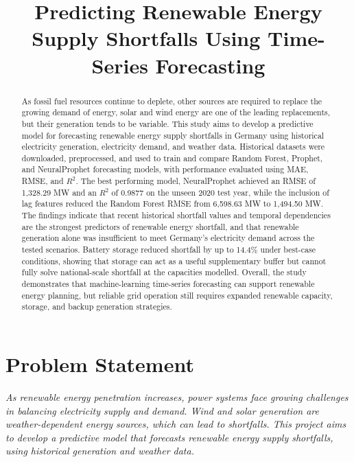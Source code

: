 \documentclass[conference]{IEEEtran}
\begin{document}
\title{Predicting Renewable Energy Supply Shortfalls Using Time-Series Forecasting}

\author{
}

\maketitle
\begin{abstract}
As fossil fuel resources continue to deplete, other sources are required to replace the growing demand of energy, solar and wind energy are one of the leading replacements, but their generation tends to be variable. This study aims to develop a predictive model for forecasting renewable energy supply shortfalls in Germany using historical electricity generation, electricity demand, and weather data. Historical datasets were downloaded, preprocessed, and used to train and compare Random Forest, Prophet, and NeuralProphet forecasting models, with performance evaluated using MAE, RMSE, and \(R^2\). The best performing model, NeuralProphet achieved an RMSE of 1{,}328.29 MW and an \(R^2\) of 0.9877 on the unseen 2020 test year, while the inclusion of lag features reduced the Random Forest RMSE from 6{,}598.63 MW to 1{,}494.50 MW. The findings indicate that recent historical shortfall values and temporal dependencies are the strongest predictors of renewable energy shortfall, and that renewable generation alone was insufficient to meet Germany's electricity demand across the tested scenarios. Battery storage reduced shortfall by up to 14.4\% under best-case conditions, showing that storage can act as a useful supplementary buffer but cannot fully solve national-scale shortfall at the capacities modelled. Overall, the study demonstrates that machine-learning time-series forecasting can support renewable energy planning, but reliable grid operation still requires expanded renewable capacity, storage, and backup generation strategies.
\end{abstract}

\section{Problem Statement}
\textit{As renewable energy penetration increases, power systems face growing challenges in balancing electricity supply and demand. Wind and solar generation are weather-dependent energy sources, which can lead to shortfalls. This project aims to develop a predictive model that forecasts renewable energy supply shortfalls, using historical generation and weather data.}
\end{document}
